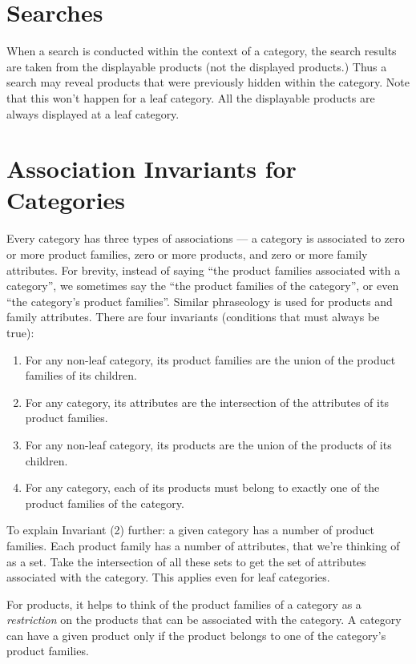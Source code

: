 \documentclass[letterpaper, 12pt]{article}
\begin{document}
\section{Searches}
When a search is conducted within the context of a category, the search results are taken from the displayable products (not the displayed products.)  Thus a search may reveal products that were previously hidden within the category.  Note that this won't happen for a leaf category.  All the displayable products are always displayed at a leaf category.

\section{Association Invariants for Categories}\label{association-invariants}
Every category has three types of associations ---  a category is associated to zero or more product families, zero or more products, and zero or more family attributes.
For brevity, instead of saying ``the product families associated with a category'', we sometimes say the ``the product families of the category'', or even ``the category's product families''.  Similar phraseology is used for products and family attributes. There are four invariants (conditions that must always be true):
\begin{enumerate}
\item For any non-leaf category, its product families are the union of the product families of its children.
\item For any category, its attributes are the intersection of the attributes of its product families.
\item For any non-leaf category, its products are the union of the products of its children.
\item For any category, each of its products must belong to exactly one of the product families of the category.   
\end{enumerate}
To explain Invariant (2) further: a given category has a number of product families.  Each product family has a number of attributes, that we're thinking of as a set.  Take the intersection of all these sets to get the set of attributes associated with the category.   This applies even for leaf categories.  
\par
For products, it helps to think of the product families of a category as a {\em restriction} on the products that can be associated with the category.  A category can have a given product only if the product belongs to one of the category's product families.  
\end{document}
